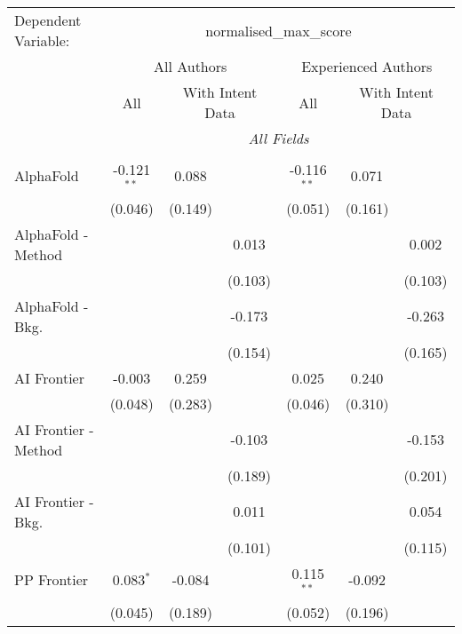 \begingroup
\centering
\begin{tabular}{lcccccc}
   \tabularnewline \midrule \midrule
   Dependent Variable: & \multicolumn{6}{c}{normalised\_max\_score}\\
 & \multicolumn{3}{c}{All Authors} & \multicolumn{3}{c}{Experienced Authors} \\
\cmidrule(lr){2-4} \cmidrule(lr){5-7}
 & \multicolumn{1}{c}{All} & \multicolumn{2}{c}{With Intent Data} & \multicolumn{1}{c}{All} & \multicolumn{2}{c}{With Intent Data} \\
\cmidrule(lr){2-2} \cmidrule(lr){3-4} \cmidrule(lr){5-5} \cmidrule(lr){6-7}
 & \multicolumn{6}{c}{\textit{All Fields}} \\ \\
   AlphaFold            & -0.121$^{**}$ & 0.088   &         & -0.116$^{**}$ & 0.071   &   \\   
                        & (0.046)       & (0.149) &         & (0.051)       & (0.161) &   \\   
   AlphaFold - Method   &               &         & 0.013   &               &         & 0.002\\   
                        &               &         & (0.103) &               &         & (0.103)\\   
   AlphaFold - Bkg.     &               &         & -0.173  &               &         & -0.263\\   
                        &               &         & (0.154) &               &         & (0.165)\\   
   AI Frontier          & -0.003        & 0.259   &         & 0.025         & 0.240   &   \\   
                        & (0.048)       & (0.283) &         & (0.046)       & (0.310) &   \\   
   AI Frontier - Method &               &         & -0.103  &               &         & -0.153\\   
                        &               &         & (0.189) &               &         & (0.201)\\   
   AI Frontier - Bkg.   &               &         & 0.011   &               &         & 0.054\\   
                        &               &         & (0.101) &               &         & (0.115)\\   
   PP Frontier          & 0.083$^{*}$   & -0.084  &         & 0.115$^{**}$  & -0.092  &   \\   
                        & (0.045)       & (0.189) &         & (0.052)       & (0.196) &   \\   

\end{tabular}
